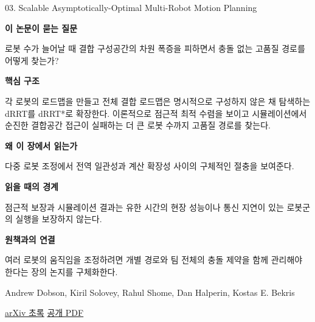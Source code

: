 \documentclass[11pt,openany]{book}
\begin{document}
\begin{termcard}{03. Scalable Asymptotically-Optimal Multi-Robot Motion Planning}

\par

\medskip

{\sffamily\bfseries\color{deepblue} 이 논문이 묻는 질문}\par

로봇 수가 늘어날 때 결합 구성공간의 차원 폭증을 피하면서 충돌 없는 고품질 경로를 어떻게 찾는가?

\smallskip

{\sffamily\bfseries\color{deepblue} 핵심 구조}\par

각 로봇의 로드맵을 만들고 전체 결합 로드맵은 명시적으로 구성하지 않은 채 탐색하는 dRRT를 dRRT*로 확장한다. 이론적으로 점근적 최적 수렴을 보이고 시뮬레이션에서 순진한 결합공간 접근이 실패하는 더 큰 로봇 수까지 고품질 경로를 찾는다.

\smallskip

{\sffamily\bfseries\color{deepblue} 왜 이 장에서 읽는가}\par

다중 로봇 조정에서 전역 일관성과 계산 확장성 사이의 구체적인 절충을 보여준다.

\smallskip

{\sffamily\bfseries\color{coral} 읽을 때의 경계}\par

점근적 보장과 시뮬레이션 결과는 유한 시간의 현장 성능이나 통신 지연이 있는 로봇군의 실행을 보장하지 않는다.

\smallskip

{\sffamily\bfseries\color{teal} 원책과의 연결}\par

여러 로봇의 움직임을 조정하려면 개별 경로와 팀 전체의 충돌 제약을 함께 관리해야 한다는 장의 논지를 구체화한다.

\medskip

{\footnotesize\color{muted} Andrew Dobson, Kiril Solovey, Rahul Shome, Dan Halperin, Kostas E. Bekris\par

\href{https://arxiv.org/abs/1706.09932}{arXiv 초록} \quad \href{https://arxiv.org/pdf/1706.09932}{공개 PDF}\par}

\end{termcard}
\end{document}
